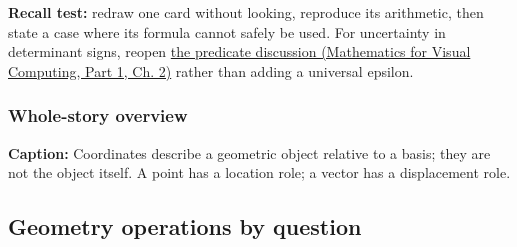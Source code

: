\textbf{Recall test:} redraw one card without looking, reproduce its arithmetic, then state a case where its formula cannot safely be used. For uncertainty in determinant signs, reopen \href{../02-Mathematics-for-Visual-Computing-P01/main.pdf\#nameddest=01-foundations-i-ch018-a-predicate-needs-a-trustworthy-sign}{the predicate discussion (Mathematics for Visual Computing, Part 1, Ch. 2)} rather than adding a universal epsilon.

\subsubsection{Whole-story overview}\label{appendix-38d9c8aca357-whole-story-overview}

\hypertarget{appendix-38d9c8aca357-whole-story-overview}{}


\textbf{Caption:} Coordinates describe a geometric object relative to a basis; they are not the object itself. A point has a location role; a vector has a displacement role.

\subsection{Geometry operations by question}\label{appendix-38d9c8aca357-geometry-operations-by-question}

\hypertarget{appendix-38d9c8aca357-geometry-operations-by-question}{}


